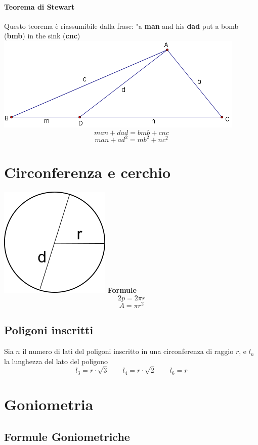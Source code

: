 \documentclass[12pt, a4paper,oneside]{report}
\begin{document}
	\paragraph{Teorema di Stewart}
	Questo teorema è riassumibile dalla frase: "a \textbf{man} and his \textbf{dad} put a bomb (\textbf{bmb}) in the sink (\textbf{cnc})\\
	\includegraphics{Ste.jpg}\\
	\[
	man + dad = bmb + cnc
	\]
	\[
	man + ad^2 = mb^2 + nc^2
	\]
	\section{Circonferenza e cerchio}
	\includegraphics{Ci.jpg}
	\textbf{Formule}
	\[
	2p=2\pi r
	\]
	\[
	A=\pi r^2
	\]
	\subsection{Poligoni inscritti}
	Sia $n$ il numero di lati del poligoni inscritto in una circonferenza di raggio $r$, e $l_n$ la lunghezza del lato del poligono
	\[
	l_3=r\cdot\sqrt{3}\qquad l_4=r\cdot\sqrt{2}\qquad l_6=r
	\]
	\section{Goniometria}
		\subsection{Formule Goniometriche}
\end{document}
